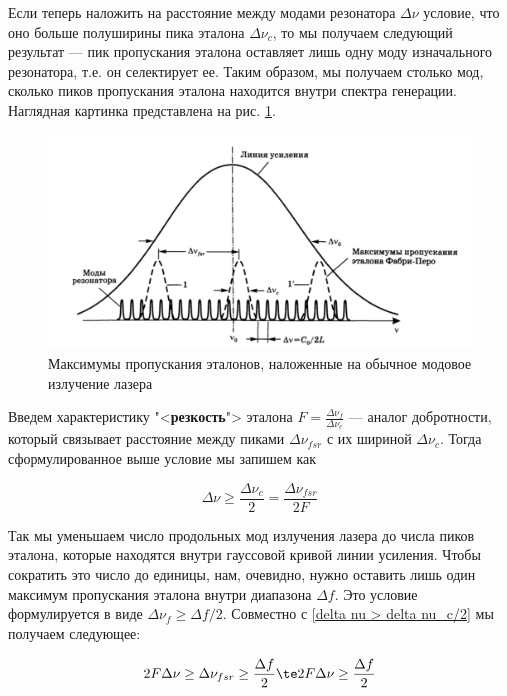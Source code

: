 \documentclass[12pt]{kiarticle}
\begin{document}
Если теперь наложить на расстояние между модами резонатора $ \Delta \nu $ условие, что оно больше полуширины пика эталона $ \Delta \nu_c $, то мы получаем следующий результат --- пик пропускания эталона оставляет лишь одну моду изначального резонатора, т.е. он селектирует ее. Таким образом, мы получаем столько мод, сколько пиков пропускания эталона находится внутри спектра генерации. Наглядная картинка представлена на рис. \ref{selection}. 

\begin{figure}[h!]
 	\centering
 	\includegraphics[width=\linewidth]{selection}
 	\caption{{\small Максимумы пропускания эталонов, наложенные на обычное модовое излучение лазера}}
 	\label{selection}
\end{figure}

Введем характеристику "<\textbf{резкость}"> эталона $ F = \frac{\Delta \nu_f}{\Delta \nu_c} $ --- аналог добротности, который связывает расстояние между пиками $ \Delta \nu_{fsr} $ с их шириной $ \Delta \nu_c $. Тогда сформулированное выше условие мы запишем как

\begin{equation}\label{delta nu > delta nu_c/2}
\Delta \nu \geq \dfrac{\Delta \nu_c}{2} = \dfrac{\Delta \nu_{fsr}}{2F}
\end{equation}

Так мы уменьшаем число продольных мод излучения лазера до числа пиков эталона, которые находятся внутри гауссовой кривой линии усиления. Чтобы сократить это число до единицы, нам, очевидно, нужно оставить лишь один максимум пропускания эталона внутри диапазона $ \Delta f $. Это условие формулируется в виде $ \Delta \nu_f \geq \Delta f /2$. Совместно с \eqref{delta nu > delta nu_c/2}  мы получаем следующее:

\begin{equation}\label{}
2 F \Delta \nu \geq \Delta \nu_{fsr} \geq \dfrac{\Delta f}{2} \te 2 F \Delta \nu \geq \dfrac{\Delta f}{2}
\end{equation}
\end{document}
